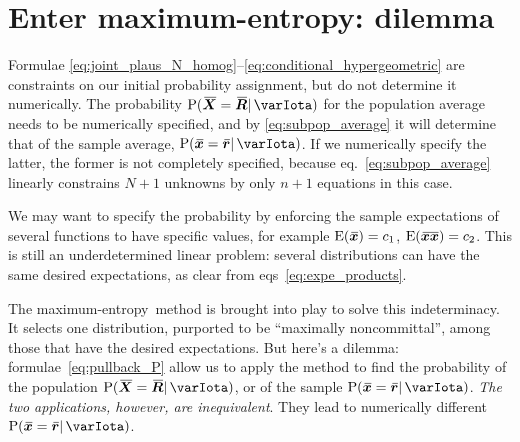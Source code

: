 \documentclass{article}
\theoremstyle{remark}
\theoremstyle{innote}
\renewcommand*{\|}{\mathpunct{|}}%
\newcommand*{\p}{\mathrm{P}}%
\newcommand*{\eqn}{eq.}%
\newcommand*{\eqns}{eqs}%
\newcommand*{\E}{\mathrm{E}}
\DeclarePairedDelimiter\expp{(}{)}
\newcommand*{\expe}{\E\expp}%
\theoremstyle{simple}
\newcommand*{\widebar}[1]{{\mkern1.5mu\skew{2}\overline{\mkern-1.5mu#1\mkern-1.5mu}\mkern 1.5mu}}
\newcommand*{\av}{\widebar} %
\newcommand*{\sav}{\widebar} %
\newcommand*{\yxx}{x}%
\newcommand*{\yx}{\bm{\yxx}}%
\newcommand*{\yxs}{\sav{\yx}}%
\newcommand*{\yX}{\bm{X}}%
\newcommand*{\yXf}{\av{\yX}}%
\newcommand*{\yxxs}{\sav{\yx\yx}}%
\newcommand*{\yr}{\bm{r}}%
\newcommand*{\yrs}{\sav{\yr}}%
\newcommand*{\yR}{\bm{R}}%
\newcommand*{\yRf}{\av{\yR}}%
\newcommand*{\yH}{\varIota}
\newcommand*{\me}{maximum-entropy}
\begin{document}
\section{Enter maximum-entropy: dilemma}
\label{sec:specific_initial_probability}

Formulae
\eqref{eq:joint_plaus_N_homog}--\eqref{eq:conditional_hypergeometric} are
constraints on our initial probability assignment, but do not determine it
numerically. The probability $\p(\yXf=\yRf \| \yH)$ for the population
average needs to be numerically specified, and by \eqref{eq:subpop_average}
it will determine that of the sample average, $\p(\yxs=\yrs \| \yH)$. If we
numerically specify the latter, the former is not completely specified,
because \eqn~\eqref{eq:subpop_average} linearly constrains $N+1$ unknowns
by only $n+1$ equations in this case.

We may want to specify the probability by enforcing the sample expectations
of several functions to have specific values, for example
$\expe{\yxs}=c_1$, $\expe{\yxxs}=c_2$. This is still an underdetermined
linear problem: several distributions can have the same desired
expectations, as clear from \eqns~\eqref{eq:expe_products}.

The \me\ method is brought into play to solve this indeterminacy. It
selects one distribution, purported to be \enquote{maximally noncommittal},
among those that have the desired expectations. But here's a dilemma:
formulae~\eqref{eq:pullback_P} allow us to apply the method to find the
probability of the population $\p(\yXf=\yRf \| \yH)$, or of the sample
$\p(\yxs=\yrs \| \yH)$. \emph{The two applications, however, are
  inequivalent}. They lead to numerically different $\p(\yxs=\yrs \| \yH)$.
\end{document}
